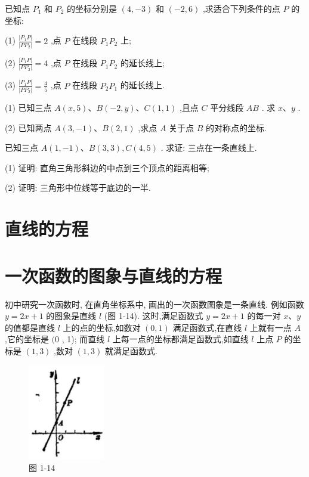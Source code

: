 \documentclass[lang=cn,newtx,10pt,scheme=chinese]{elegantbook}
\begin{document}
\begin{problemset}[习 题 一]
\item 已知点 \({P}_{1}\) 和 \({P}_{2}\) 的坐标分别是 \(\left( {4, - 3}\right)\) 和 \(\left( {-2,6}\right)\) ,求适合下列条件的点 \(P\) 的坐标:

(1) \(\frac{\left| {P}_{1}P\right| }{\left| P{P}_{2}\right| } = 2\) ,点 \(P\) 在线段 \({P}_{1}{P}_{2}\) 上;

(2) \(\frac{\left| {P}_{1}P\right| }{\left| P{P}_{2}\right| } = 4\) ,点 \(P\) 在线段 \({P}_{1}{P}_{2}\) 的延长线上;

(3) \(\frac{\left| {P}_{1}P\right| }{\left| P{P}_{2}\right| } = \frac{4}{5}\) ,点 \(P\) 在线段 \({P}_{2}{P}_{1}\) 的延长线上.

\item (1) 已知三点 \(A\left( {x,5}\right) \text{、}B\left( {-2,y}\right) \text{、}C\left( {1,1}\right)\) ,且点 \(C\) 平分线段 \({AB}\) . 求 \(x\text{、}y\) .

(2) 已知两点 \(A\left( {3, - 1}\right) \text{、}B\left( {2,1}\right)\) ,求点 \(A\) 关于点 \(B\) 的对称点的坐标.

\item 已知三点 \(A\left( {1, - 1}\right) \text{、}B\left( {3,3}\right) ,C\left( {4,5}\right)\) . 求证: 三点在一条直线上.

\item (1) 证明: 直角三角形斜边的中点到三个顶点的距离相等;

(2) 证明: 三角形中位线等于底边的一半.
\end{problemset}

\section*{直线的方程}

\section{一次函数的图象与直线的方程}

初中研究一次函数时, 在直角坐标系中, 画出的一次函数图象是一条直线. 例如函数 \(y = {2x} + 1\) 的图象是直线 \(l\) (图 1-14). 这时,满足函数式 \(y = {2x} + 1\) 的每一对 \(x\text{、}y\) 的值都是直线 \(l\) 上的点的坐标,如数对 \(\left( {0,1}\right)\) 满足函数式,在直线 \(l\) 上就有一点 \(A\) ,它的坐标是 \((0\) , 1); 而直线 \(l\) 上每一点的坐标都满足函数式,如直线 \(l\) 上点 \(P\) 的坐标是 \(\left( {1,3}\right)\) ,数对 \(\left( {1,3}\right)\) 就满足函数式.

\begin{figure}[h]
  \centering
  \includegraphics[max width=0.3\textwidth]{images/01912cc2-ffb6-728e-9ae7-b113ff05c64b_18_311691.jpg}
  \caption{图 1-14}
\end{figure}
\end{document}
